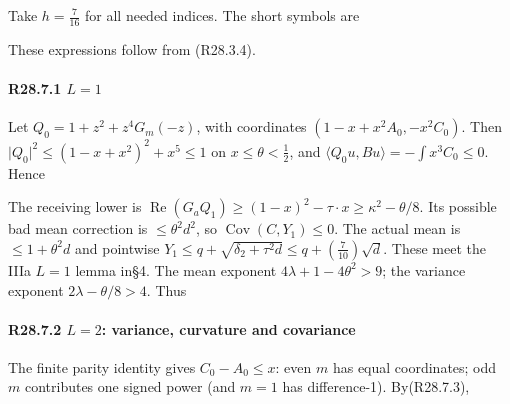 
Take \(h=\frac{7}{16}\) for all needed indices. The short symbols are


These expressions follow from (R28.3.4).

\paragraph{R28.7.1 \(L=1\)}

Let \(Q_{0}=1+z^2+z^4G_m(-z)\), with coordinates \((1-x+x^2A_0,\allowbreak \allowbreak -x^2C_0)\). Then \(\lvert Q_{0}\rvert ^2\le (1-x+x^2)^2+x^5\le 1\) on \(x\le \theta<\frac{1}{2}\), and \(\langle Q_0 u,\allowbreak \allowbreak Bu\rangle =-\int  x^3C_0\le 0\). Hence


The receiving lower is \(\operatorname{Re}(G_a Q_{1})\ge (1-x)^2-\tau\cdot x \ge \kappa^2-\theta/8\). Its possible bad mean correction is \(\le \theta^2d^2\), so \(\operatorname{Cov}(C,\allowbreak \allowbreak Y_{1})\le 0\). The actual mean is \(\le 1+\theta^2d\) and pointwise \(Y_{1}\le q+\sqrt{\delta_2+\tau^2d}\le q+(\frac{7}{10})\sqrt{d}\). These meet the IIIa \(L=1\) lemma in§4. The mean exponent \(4\lambda+1-4\theta^2>9\); the variance exponent \(2\lambda-\theta/8>4\). Thus


\paragraph{R28.7.2 \(L=2\): variance, curvature and covariance}

The finite parity identity gives \(C_0-A_0\le x\): even \(m\) has equal coordinates; odd \(m\) contributes one signed power (and \(m=1\) has difference-1). By(R28.7.3),

